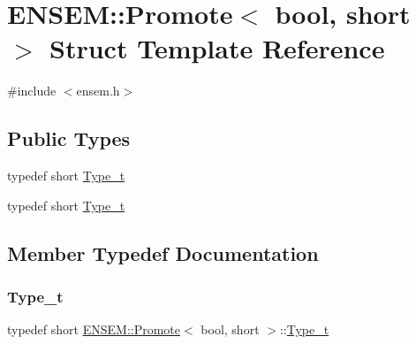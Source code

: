 \hypertarget{structENSEM_1_1Promote_3_01bool_00_01short_01_4}{}\section{E\+N\+S\+EM\+:\+:Promote$<$ bool, short $>$ Struct Template Reference}
\label{structENSEM_1_1Promote_3_01bool_00_01short_01_4}


{\ttfamily \#include $<$ensem.\+h$>$}

\subsection*{Public Types}
\begin{DoxyCompactItemize}
\item 
typedef short \mbox{\hyperlink{structENSEM_1_1Promote_3_01bool_00_01short_01_4_a3a13222623387509ba3bc981fe9b2d4f}{Type\+\_\+t}}
\item 
typedef short \mbox{\hyperlink{structENSEM_1_1Promote_3_01bool_00_01short_01_4_a3a13222623387509ba3bc981fe9b2d4f}{Type\+\_\+t}}
\end{DoxyCompactItemize}


\subsection{Member Typedef Documentation}
\mbox{\label{structENSEM_1_1Promote_3_01bool_00_01short_01_4_a3a13222623387509ba3bc981fe9b2d4f}} 
\subsubsection{\texorpdfstring{Type\_t}{Type\_t}\hspace{0.1cm}{\footnotesize\ttfamily [1/2]}}
{\footnotesize\ttfamily typedef short \mbox{\hyperlink{structENSEM_1_1Promote}{E\+N\+S\+E\+M\+::\+Promote}}$<$ bool, short $>$\+::\mbox{\hyperlink{structENSEM_1_1Promote_3_01bool_00_01short_01_4_a3a13222623387509ba3bc981fe9b2d4f}{Type\+\_\+t}}}

\mbox{\label{structENSEM_1_1Promote_3_01bool_00_01short_01_4_a3a13222623387509ba3bc981fe9b2d4f}} 
